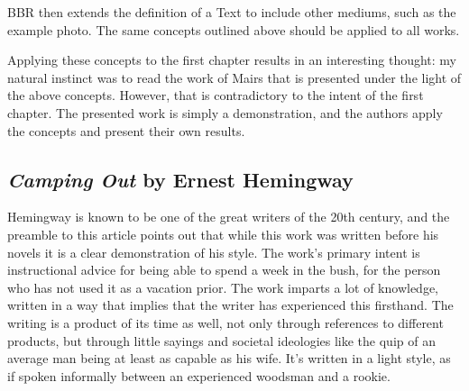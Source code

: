 \documentclass[journal.tex]{subfiles}
\begin{document}
BBR then extends the definition of a Text to include other mediums, such as the example photo.
The same concepts outlined above should be applied to all works. 

Applying these concepts to the first chapter results in an interesting thought: my natural instinct was to read the work of Mairs that is presented under the light of the above concepts.
However, that is contradictory to the intent of the first chapter.
The presented work is simply a demonstration, and the authors apply the concepts and present their own results.


\subsection*{\textit{Camping Out} by Ernest Hemingway}

Hemingway is known to be one of the great writers of the 20th century, and the preamble to this article points out that while this work was written before his novels it is a clear demonstration of his style.
The work's primary intent is instructional advice for being able to spend a week in the bush, for the person who has not used it as a vacation prior.
The work imparts a lot of knowledge, written in a way that implies that the writer has experienced this firsthand.
The writing is a product of its time as well, not only through references to different products, but through little sayings and societal ideologies like the quip of an average man being at least as capable as his wife.
It's written in a light style, as if spoken informally between an experienced woodsman and a rookie. 
\end{document}
